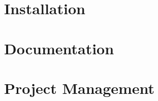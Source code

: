 \documentclass[a4paper, 11pt, oneside]{Main}  %
\begin{document}


\appendix %

\chapter{Installation}
\chapter{Documentation}
\chapter{Project Management}

\backmatter

\label{Bibliography}
\end{document}
